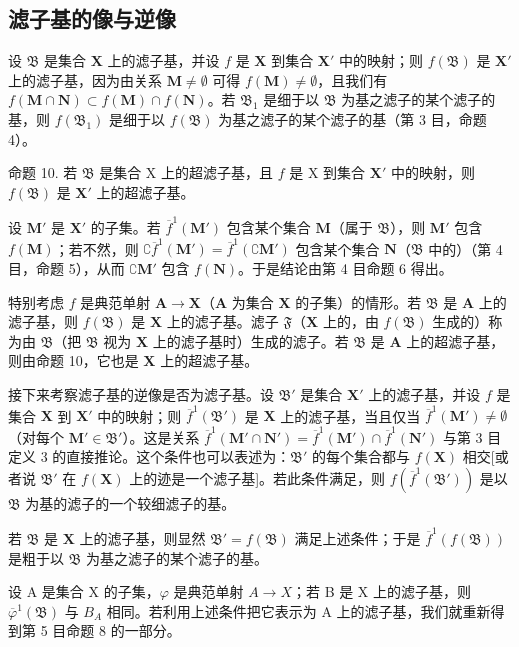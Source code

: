 \subsection{滤子基的像与逆像}

设 \(\mathfrak{B}\) 是集合 \(\mathbf{X}\) 上的滤子基，并设 \(f\) 是 \(\mathbf{X}\) 到集合 \(\mathbf{X}'\) 中的映射；则 \(f(\mathfrak{B})\) 是 \(\mathbf{X}'\) 上的滤子基，因为由关系 \(\mathbf{M} \neq \emptyset\) 可得 \(f(\mathbf{M}) \neq \emptyset\)，且我们有 \(f(\mathbf{M} \cap \mathbf{N}) \subset f(\mathbf{M}) \cap f(\mathbf{N})\)。若 \(\mathfrak{B}_1\) 是细于以 \(\mathfrak{B}\) 为基之滤子的某个滤子的基，则 \(f(\mathfrak{B}_1)\) 是细于以 \(f(\mathfrak{B})\) 为基之滤子的某个滤子的基（第 3 目，命题 4）。

命题 10. 若 \(\mathfrak{B}\) 是集合 X 上的超滤子基，且 \(f\) 是 X 到集合 \(\mathbf{X}'\) 中的映射，则 \(f(\mathfrak{B})\) 是 \(\mathbf{X}'\) 上的超滤子基。

设 \(\mathbf{M}'\) 是 \(\mathbf{X}'\) 的子集。若 \(\overline{f}^{1}(\mathbf{M}')\) 包含某个集合 \(\mathbf{M}\)（属于 \(\mathfrak{B}\)），则 \(\mathbf{M}'\) 包含 \(f(\mathbf{M})\)；若不然，则 \(\complement \overline{f}^{1}(\mathbf{M}') = \overline{f}^{1}(\complement \mathbf{M}')\) 包含某个集合 \(\mathbf{N}\)（\(\mathfrak{B}\) 中的）（第 4 目，命题 5），从而 \(\complement \mathbf{M}'\) 包含 \(f(\mathbf{N})\)。于是结论由第 4 目命题 6 得出。

特别考虑 \(f\) 是典范单射 \(\mathbf{A} \to \mathbf{X}\)（\(\mathbf{A}\) 为集合 \(\mathbf{X}\) 的子集）的情形。若 \(\mathfrak{B}\) 是 \(\mathbf{A}\) 上的滤子基，则 \(f(\mathfrak{B})\) 是 \(\mathbf{X}\) 上的滤子基。滤子 \(\mathfrak{F}\)（\(\mathbf{X}\) 上的，由 \(f(\mathfrak{B})\) 生成的）称为由 \(\mathfrak{B}\)（把 \(\mathfrak{B}\) 视为 \(\mathbf{X}\) 上的滤子基时）生成的滤子。若 \(\mathfrak{B}\) 是 \(\mathbf{A}\) 上的超滤子基，则由命题 10，它也是 \(\mathbf{X}\) 上的超滤子基。

接下来考察滤子基的逆像是否为滤子基。设 \(\mathfrak{B}'\) 是集合 \(\mathbf{X}'\) 上的滤子基，并设 \(f\) 是集合 \(\mathbf{X}\) 到 \(\mathbf{X}'\) 中的映射；则 \(\overline{f}^{1}(\mathfrak{B}')\) 是 \(\mathbf{X}\) 上的滤子基，当且仅当 \(\overline{f}^{1}(\mathbf{M}') \neq \emptyset\)（对每个 \(\mathbf{M}' \in \mathfrak{B}'\)）。这是关系 \(\overline{f}^{1}(\mathbf{M}' \cap \mathbf{N}') = \overline{f}^{1}(\mathbf{M}') \cap \overline{f}^{1}(\mathbf{N}')\) 与第 3 目定义 3 的直接推论。这个条件也可以表述为：\(\mathfrak{B}'\) 的每个集合都与 \(f(\mathbf{X})\) 相交{[}或者说 \(\mathfrak{B}'\) 在 \(f(\mathbf{X})\) 上的迹是一个滤子基{]}。若此条件满足，则 \(f(\overline{f}^{1}(\mathfrak{B}'))\) 是以 \(\mathfrak{B}\) 为基的滤子的一个较细滤子的基。

若 \(\mathfrak{B}\) 是 \(\mathbf{X}\) 上的滤子基，则显然 \(\mathfrak{B}' = f(\mathfrak{B})\) 满足上述条件；于是 \(\overline{f}^1 (f(\mathfrak{B}))\) 是粗于以 \(\mathfrak{B}\) 为基之滤子的某个滤子的基。

设 A 是集合 X 的子集，\(\varphi\) 是典范单射 \(A \rightarrow X\)；若 B 是 X 上的滤子基，则 \(\overline{\varphi}^{1}(\mathfrak{B})\) 与 \(B_{A}\) 相同。若利用上述条件把它表示为 A 上的滤子基，我们就重新得到第 5 目命题 8 的一部分。

